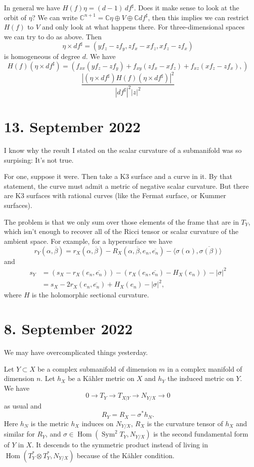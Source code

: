 \documentclass[11pt]{amsart}
\theoremstyle{definition}
\newcommand{\kk}[1]{\mathbb{#1}}
\def\ov#1{\overline{#1}}
\DeclareMathOperator{\Hom}{Hom}
\begin{document}
In general we have $H(f) \eta = (d-1) \, df^{\sharp}$.
Does it make sense to look at the orbit of $\eta$?
We can write $\kk C^{n+1} = \kk C \eta \oplus V \oplus \kk C df^{\sharp}$, then this implies we can restrict $H(f)$ to $V$ and only look at what happens there.
For three-dimensional spaces we can try to do as above.
Then
\[
  \eta \times df^{\sharp}
  = (
  y f_{z} - z f_{y},
  z f_{x} - x f_{z},
  x f_{z} - z f_{x}
  )
\]
is homogeneous of degree $d$.
We have
\[
  H(f)(\eta \times df^{\sharp})
  = (
  f_{xx}(yf_{z} - zf_{y})
  + f_{xy}(zf_{x} - xf_{z})
  + f_{xz}(xf_{z} - zf_{x}),
  )
\]
\[
  \frac{
    |(\eta \times df^{\sharp})
    H(f)
    (\eta \times df^{\sharp})|^{2}
  }{|df^{\sharp}|^{2}|z|^{2}}
\]


\section{13. September 2022}

I know why the result I stated on the scalar curvature of a submanifold was so
surpising: It's not true.

For one, suppose it were. Then take a K3 surface and a curve in it. By that
statement, the curve must admit a metric of negative scalar curvature. But there
are K3 surfaces with rational curves (like the Fermat surface, or Kummer
surfaces).

The problem is that we only sum over those elements of the frame that are in
$T_Y$, which isn't enough to recover all of the Ricci tensor or scalar curvature
of the ambient space. For example, for a hypersurface we have
\[
r_Y(\alpha, \ov\beta)
= r_X(\alpha, \ov\beta)
- R_X(\alpha, \ov\beta, e_n, \ov{e_n})
- \langle \sigma(\alpha), \ov{\sigma(\beta)} \rangle
\]
and
\begin{align*}
s_Y
&= (s_X - r_X(e_n, \ov{e_n}))
- (r_X(e_n, \ov{e_n}) - H_X(e_n))
- |\sigma|^2
\\
&= s_X - 2 r_X(e_n, \ov{e_n}) + H_X(e_n) - |\sigma|^2,
\end{align*}
where $H$ is the holomorphic sectional curvature.

\section{8. September 2022}

We may have overcomplicated things yesterday.

Let $Y \subset X$ be a complex submanifold of dimension $m$ in a complex
manifold of dimension $n$.
Let $h_X$ be a K\"ahler metric on $X$ and $h_Y$ the induced metric on $Y$.
We have
$$
0 \to T_Y \to T_{X|Y} \to N_{Y/X} \to 0
$$
as usual and
$$
R_Y = R_X - \sigma^* h_N.
$$
Here $h_N$ is the metric $h_X$ induces on $N_{Y/X}$, $R_X$ is the curvature
tensor of $h_X$ and similar for $R_Y$, and $\sigma \in \Hom(\operatorname{Sym}^2
T_Y, N_{Y/X})$ is the second fundamental form of $Y$ in $X$. It descends to the
symmetric product instead of living in $\Hom(T_Y^* \otimes T_Y^*, N_{Y/X})$
because of the K\"ahler condition.
\end{document}
